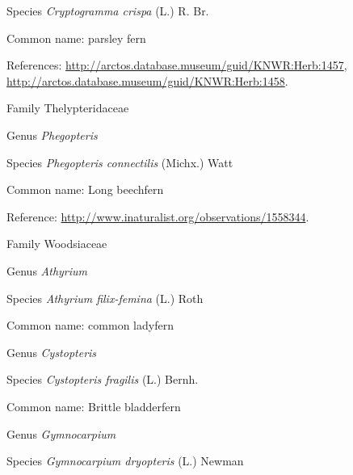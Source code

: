 \documentclass[9pt, article]{memoir}
\begin{document}
\begin{multicols}{2}
\vspace{6pt}\noindent\hspace{36pt}Species \textit{Cryptogramma crispa} (L.) R. Br.


Common name: parsley fern

References: 
\url{http://arctos.database.museum/guid/KNWR:Herb:1457}, 
\url{http://arctos.database.museum/guid/KNWR:Herb:1458}.

\vspace{6pt}\noindent\hspace{24pt}Family Thelypteridaceae


\vspace{6pt}\noindent\hspace{30pt}Genus \textit{Phegopteris}


\vspace{6pt}\noindent\hspace{36pt}Species \textit{Phegopteris connectilis} (Michx.) Watt


Common name: Long beechfern

Reference: 
\url{http://www.inaturalist.org/observations/1558344}.

\vspace{6pt}\noindent\hspace{24pt}Family Woodsiaceae


\vspace{6pt}\noindent\hspace{30pt}Genus \textit{Athyrium}


\vspace{6pt}\noindent\hspace{36pt}Species \textit{Athyrium filix-femina} (L.) Roth


Common name: common ladyfern

\vspace{6pt}\noindent\hspace{30pt}Genus \textit{Cystopteris}


\vspace{6pt}\noindent\hspace{36pt}Species \textit{Cystopteris fragilis} (L.) Bernh.


Common name: Brittle bladderfern

\vspace{6pt}\noindent\hspace{30pt}Genus \textit{Gymnocarpium}


\vspace{6pt}\noindent\hspace{36pt}Species \textit{Gymnocarpium dryopteris} (L.) Newman



\end{multicols}
\end{document}
